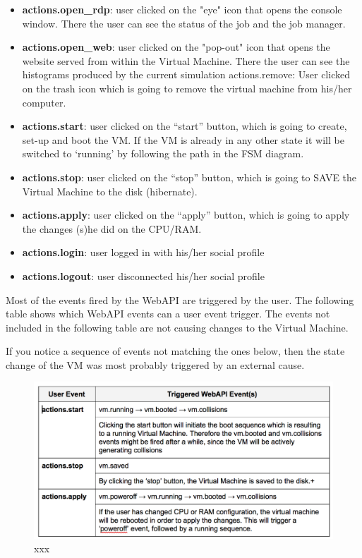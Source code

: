 \documentclass{article}
\begin{document}
\begin{itemize}
    \item {\bf actions.open\_rdp}: user clicked on the "eye" icon that opens the console window. There the user can see the status of the job and the job manager.
    
    \item {\bf actions.open\_web}: user clicked on the "pop-out" icon that opens the website served from within the Virtual Machine. There the user can see the histograms produced by the current simulation
actions.remove: User clicked on the trash icon which is going to remove the virtual machine from his/her computer.
    \item {\bf actions.start}: user clicked on the “start” button, which is going to create, set-up and boot the VM. If the VM is already in any other state it will be switched to ‘running’ by following the path in the FSM diagram.
    \item {\bf actions.stop}: user clicked on the “stop” button, which is going to SAVE the Virtual Machine to the disk (hibernate). 
    \item {\bf actions.apply}: user clicked on the “apply” button, which is going to apply the changes (s)he did on the CPU/RAM.
    \item {\bf actions.login}: user logged in with his/her social profile
    \item {\bf actions.logout}: user disconnected his/her social profile
\end{itemize}



Most of the events fired by the WebAPI are triggered by the user. The following table shows which WebAPI events can a user event trigger. The events not included in the following table are not causing changes to the Virtual Machine.

If you notice a sequence of events not matching the ones below, then the state change of the VM was most probably triggered by an external cause. 


\begin{figure}[t]
  \begin{center}
		\includegraphics[width=\columnwidth]{imgs/webAPIEventsSequenceTable.png}
  \end{center}
\caption{xxx}
\label{xxx}
\end{figure}
\end{document}
